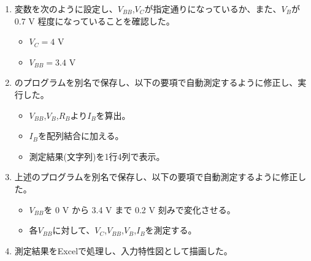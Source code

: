 \documentclass[11pt,dvipdfmx]{jarticle}
\begin{document}
\begin{enumerate}
			\item 変数を次のように設定し、$V_{BB}$,$V_C$が指定通りになっているか、また、$V_B$が0.7 V 程度になっていることを確認した。
			\begin{itemize}
				\item $V_C=4$ V
				\item $V_{BB}=3.4$ V
			\end{itemize}
			\item {}のプログラムを別名で保存し、以下の要項で自動測定するように修正し、実行した。
			\begin{itemize}
				\item $V_{BB}$,$V_B$,$R_B$より$I_B$を算出。
				\item $I_B$を配列結合に加える。
				\item 測定結果(文字列)を1行4列で表示。
			\end{itemize}
			\item 上述のプログラムを別名で保存し、以下の要項で自動測定するように修正した。
			\begin{itemize}
				\item $V_{BB}$を 0 V から 3.4 V まで 0.2 V 刻みで変化させる。
				\item 各$V_{BB}$に対して、$V_C$,$V_{BB}$,$V_B$,$I_B$を測定する。
			\end{itemize}
			\item 測定結果をExcelで処理し、入力特性図として描画した。
		\end{enumerate}
\end{document}
